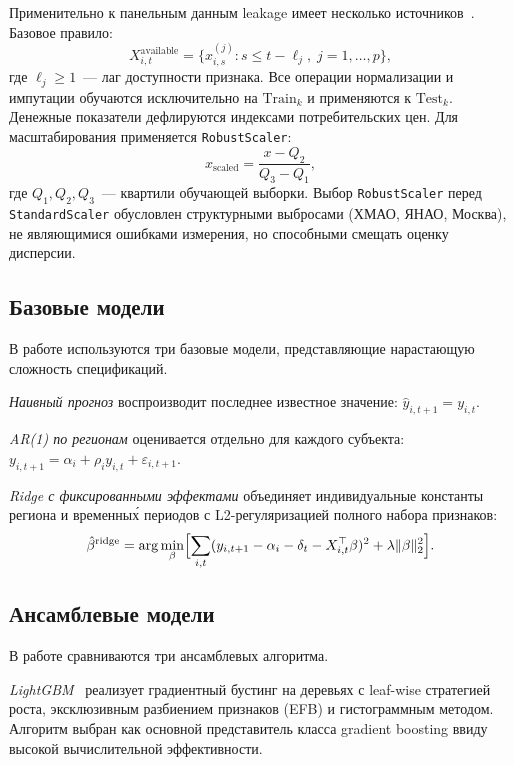 \documentclass[12pt,a4paper]{article}
\begin{document}
Применительно к панельным данным leakage имеет несколько
источников~\cite{cerqua2025}. Базовое правило:
\begin{equation}
  X^{\text{available}}_{i,t} = \{x^{(j)}_{i,s} : s \le t - \ell_j,\;
  j = 1,\ldots,p\},
\end{equation}
где $\ell_j \ge 1$~--- лаг доступности признака. Все операции нормализации
и импутации обучаются исключительно на $\mathrm{Train}_k$ и применяются
к $\mathrm{Test}_k$. Денежные показатели дефлируются индексами
потребительских цен. Для масштабирования применяется \texttt{RobustScaler}:
\begin{equation}
  x_{\text{scaled}} = \frac{x - Q_2}{Q_3 - Q_1},
\end{equation}
где $Q_1, Q_2, Q_3$~--- квартили обучающей выборки. Выбор \texttt{RobustScaler}
перед \texttt{StandardScaler} обусловлен структурными выбросами
(ХМАО, ЯНАО, Москва), не являющимися ошибками измерения, но способными
смещать оценку дисперсии.

\subsection{Базовые модели}

В работе используются три базовые модели, представляющие нарастающую
сложность спецификаций.

\textit{Наивный прогноз} воспроизводит последнее известное значение:
$\hat{y}_{i,t+1} = y_{i,t}$.

\textit{AR(1) по регионам} оценивается отдельно для каждого субъекта:
$y_{i,t+1} = \alpha_i + \rho_i y_{i,t} + \varepsilon_{i,t+1}$.

\textit{Ridge с фиксированными эффектами} объединяет индивидуальные
константы региона и временны\'{х} периодов с L2-регуляризацией полного
набора признаков:
\begin{equation}
  \hat{\beta}^{\text{ridge}} = \arg\min_{\beta}
  \Bigl[\sum_{i,t}(y_{i,t+1} - \alpha_i - \delta_t - X^\top_{i,t}\beta)^2
  + \lambda\|\beta\|^2_2\Bigr].
\end{equation}

\subsection{Ансамблевые модели}

В работе сравниваются три ансамблевых алгоритма.

\textit{LightGBM}~\cite{ke2017} реализует градиентный бустинг на
деревьях с leaf-wise стратегией роста, эксклюзивным разбиением признаков
(EFB) и гистограммным методом. Алгоритм выбран как основной представитель
класса gradient boosting ввиду высокой вычислительной эффективности.
\end{document}

